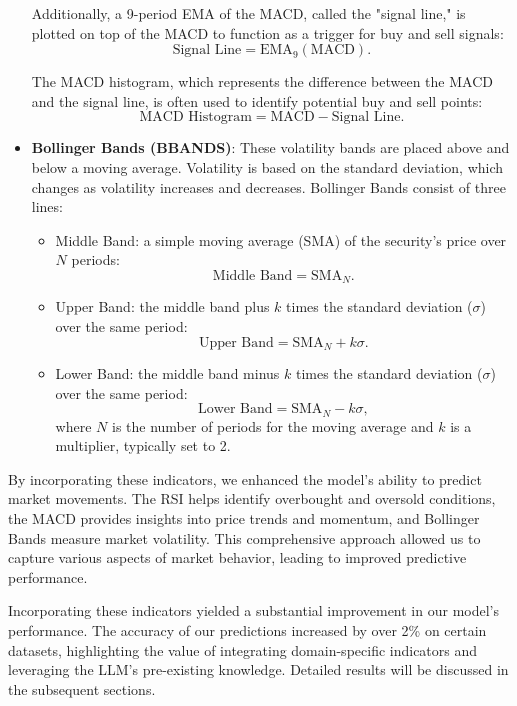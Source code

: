 \begin{itemize}
	      Additionally, a 9-period EMA of the MACD, called the "signal line," is plotted on top of the MACD to function as a trigger for buy and sell signals:
	      \[
		      \text{Signal Line} = \text{EMA}_{9}(\text{MACD}).
	      \]

	      The MACD histogram, which represents the difference between the MACD and the signal line, is often used to identify potential buy and sell points:
	      \[
		      \text{MACD Histogram} = \text{MACD} - \text{Signal Line}.
	      \]

	\item \textbf{Bollinger Bands (BBANDS)}: These volatility bands are placed above and below a moving average. Volatility is based on the standard deviation, which changes as volatility increases and decreases. Bollinger Bands consist of three lines:

	      \begin{itemize}
		      \item Middle Band: a simple moving average (SMA) of the security's price over \( N \) periods:
		            \[
			            \text{Middle Band} = \text{SMA}_{N}.
		            \]

		      \item Upper Band: the middle band plus \( k \) times the standard deviation (\( \sigma \)) over the same period:
		            \[
			            \text{Upper Band} = \text{SMA}_{N} + k\sigma.
		            \]

		      \item Lower Band: the middle band minus \( k \) times the standard deviation (\( \sigma \)) over the same period:
		            \[
			            \text{Lower Band} = \text{SMA}_{N} - k\sigma,
		            \]
		            where \( N \) is the number of periods for the moving average and \( k \) is a multiplier, typically set to 2.
	      \end{itemize}

\end{itemize}

By incorporating these indicators, we enhanced the model's ability to predict market movements. The RSI helps identify overbought and oversold conditions, the MACD provides insights into price trends and momentum, and Bollinger Bands measure market volatility. This comprehensive approach allowed us to capture various aspects of market behavior, leading to improved predictive performance.

Incorporating these indicators yielded a substantial improvement in our model's performance. The accuracy of our predictions increased by over 2\% on certain datasets, highlighting the value of integrating domain-specific indicators and leveraging the LLM's pre-existing knowledge. Detailed results will be discussed in the subsequent sections.

